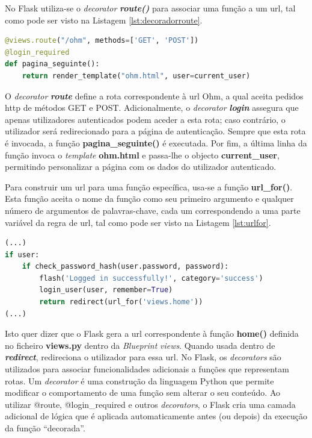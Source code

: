 No Flask utiliza-se o \textit{decorator} \textit{\textbf{route()}} para associar uma função a um \acrshort{url}, tal como pode ser visto na Listagem \ref{lst:decoradorroute}.

\begin{minipage}{0.9\linewidth}
	\begin{lstlisting}[language=Python, caption=\textit{Decorator} \textit{route()} - \textit{views.py}, label=lst:decoradorroute]
@views.route("/ohm", methods=['GET', 'POST'])
@login_required
def pagina_seguinte():
    return render_template("ohm.html", user=current_user)
\end{lstlisting}
\end{minipage}

O \textit{decorator} \textit{\textbf{route}} define a rota correspondente à \acrshort{url} Ohm, a qual aceita pedidos \acrshort{http} de métodos GET e POST. Adicionalmente, o \textit{decorator} \textit{\textbf{login}} assegura que apenas utilizadores autenticados podem aceder a esta rota; caso contrário, o utilizador será redirecionado para a página de autenticação. Sempre que esta rota é invocada, a função \textbf{pagina\_seguinte()} é executada. Por fim, a última linha da função invoca o \textit{template} \textbf{ohm.html} e passa-lhe o objecto \textbf{current\_user}, permitindo personalizar a página com os dados do utilizador autenticado.

Para construir um \acrshort{url} para uma função específica, usa-se a função \textbf{url\_for()}. Esta função aceita o nome da função como seu primeiro argumento e qualquer número de argumentos de palavras-chave, cada um correspondendo a uma parte variável da regra de \acrshort{url}, tal como pode ser visto na Listagem \ref{lst:urlfor}.

\begin{minipage}{0.9\linewidth}
	\begin{lstlisting}[language=Python, caption=Contrução de \textit{url} - \textit{auth.py}, label=lst:urlfor]
(...)
if user:
    if check_password_hash(user.password, password):
        flash('Logged in successfully!', category='success')
        login_user(user, remember=True)
        return redirect(url_for('views.home'))
(...)
\end{lstlisting}
\end{minipage}

Isto quer dizer que o Flask gera a \acrshort{url} correspondente à função \textbf{home()} definida no ficheiro \textbf{views.py} dentro da \textit{Blueprint} \textit{views}. Quando usada dentro de \textit{\textbf{redirect}}, redireciona o utilizador para essa \acrshort{url}. No Flask, os \textit{decorators} são utilizados para associar funcionalidades adicionais a funções que representam rotas. Um \textit{decorator} é uma construção da linguagem Python que permite modificar o comportamento de uma função sem alterar o seu conteúdo. Ao utilizar @route, @login\_required e outros \textit{decorators}, o Flask cria uma camada adicional de lógica que é aplicada automaticamente antes (ou depois) da execução da função ``decorada''.

